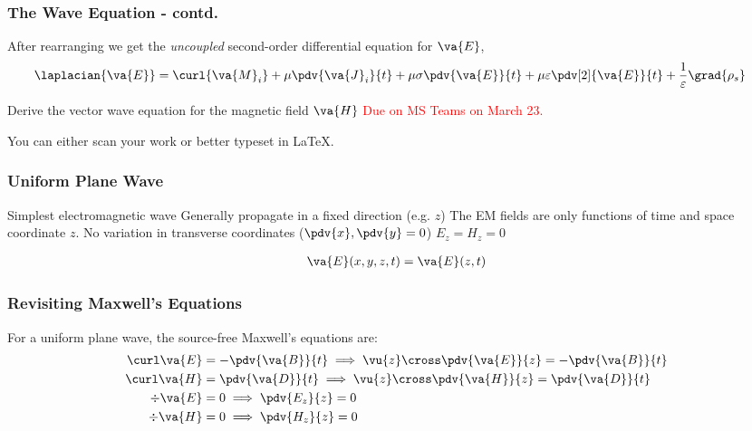 \documentclass[10pt, compress]{beamer}
\newcommand{\E}{\varepsilon}  %
\renewcommand{\u}{\mu}  %
\newcommand{\p}{\rho}  %
\begin{document}
\begin{frame}
  \frametitle{The Wave Equation - contd.}
  After rearranging we get the \textit{uncoupled} second-order differential equation for $\va{E}$,
  \begin{align*}
  \laplacian {\va{E}} &= \curl {\va{M}_i} + \u  \pdv{\va{J}_i}{t} + \u \sigma \pdv{\va{E}}{t} + \u \E \pdv[2]{\va{E}}{t} + \frac{1}{\E} \grad{\p_s}
  \end{align*}
  \begin{tcolorbox}[colback=blue!5,colframe=university-blue,title=Homework]
  \begin{outline}
    \1 Derive the vector wave equation for the magnetic field $\va{H}$
    \1 \textcolor{red}{Due on MS Teams on March 23.}

    \1 You can either scan your work or better typeset in \LaTeX.
  \end{outline}
\end{tcolorbox}
\end{frame}



\begin{frame}[fragile]
  \frametitle{Uniform Plane Wave}
      \begin{outline}
        \1 Simplest electromagnetic wave
        \1 Generally propagate in a fixed direction (e.g. $z$)
        \1 The EM fields are only functions of time and space coordinate $z$.
        \1 No variation in transverse coordinates ($\pdv{x}, \pdv{y} = 0$)
        \2 $E_z = H_z = 0$
        \end{outline}
        \begin{align*}
          \va{E}(x,y,z,t) = \va{E}(z,t)
        \end{align*}
\end{frame}
\begin{frame}[fragile]
  \frametitle{Revisiting Maxwell's Equations}
  For a uniform plane wave, the source-free Maxwell's equations are:
  \begin{align*}
\curl \va{E} &= - \pdv{\va{B}}{t} \implies \vu{z} \cross \pdv{\va{E}}{z} = - \pdv{\va{B}}{t} \\
\curl \va{H} &= \pdv{\va{D}}{t}  \implies \vu{z} \cross \pdv{\va{H}}{z} =  \pdv{\va{D}}{t} \\
\div \va{E} &= 0  \implies \pdv{{E_z}}{z} = 0\\
\div \va{H} &= 0 \implies \pdv{{H_z}}{z} = 0
\end{align*}
  \end{frame}
\end{document}
